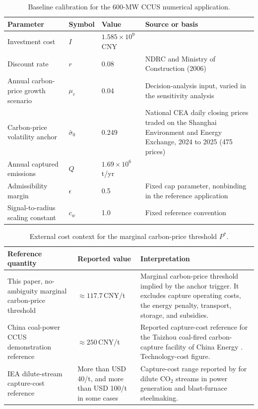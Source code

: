 \documentclass[5p,times,authoryear]{elsarticle}
\theoremstyle{plain}
\newcommand{\sbar}{\bar{\sigma}_0}
\begin{document}
\begin{table}[!t]
\caption{Baseline calibration for the 600-MW CCUS numerical application.}
\label{tab:calibration}
\centering
\footnotesize
\begin{tabular}{@{}L{0.26\textwidth}L{0.07\textwidth}L{0.16\textwidth}L{0.42\textwidth}@{}}
\toprule
Parameter & Symbol & Value & Source or basis\\
\midrule
Investment cost & $I$ & $1.585\times10^{9}$\,CNY & \citet{Sun2024}\\
Discount rate & $r$ & 0.08 & NDRC and Ministry of Construction (2006)\\
Annual carbon-price growth scenario & $\mu_c$ & 0.04 & Decision-analysis input, varied in the sensitivity analysis\\
Carbon-price volatility anchor & $\sbar$ & 0.249 & National CEA daily closing prices traded on the Shanghai Environment and Energy Exchange, 2024 to 2025 (475 prices)\\
Annual captured emissions & $Q$ & $1.69\times10^{6}$\,t/yr & \citet{Sun2024}\\
Admissibility margin & $\epsilon$ & 0.5 & Fixed cap parameter, nonbinding in the reference application\\
Signal-to-radius scaling constant & $c_w$ & 1.0 & Fixed reference convention\\
\bottomrule
\end{tabular}
\end{table}

\begin{table}[!t]
\caption{External cost context for the marginal carbon-price threshold $P^{*}$.}
\label{tab:costcontext}
\centering
\footnotesize
\begin{tabular}{@{}L{0.26\textwidth}L{0.2\textwidth}L{0.47\textwidth}@{}}
\toprule
Reference quantity & Reported value & Interpretation\\
\midrule
This paper, no-ambiguity marginal carbon-price threshold & $\approx117.7$\,CNY/t & Marginal carbon-price threshold implied by the anchor trigger. It excludes capture operating costs, the energy penalty, transport, storage, and subsidies.\\
China coal-power CCUS demonstration reference & $\approx250$\,CNY/t & Reported capture-cost reference for the Taizhou coal-fired carbon-capture facility of China Energy \citep{YangX2023}. Technology-cost figure.\\
IEA dilute-stream capture-cost reference & More than USD 40/t, and more than USD 100/t in some cases & Capture-cost range reported by \citet{IEA2020} for dilute CO$_2$ streams in power generation and blast-furnace steelmaking.\\
\bottomrule
\end{tabular}
\end{table}
\end{document}
